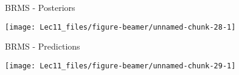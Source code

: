 \documentclass[11pt,ignorenonframetext,]{beamer}
\begin{document}
\begin{frame}{BRMS - Posteriors}
\protect\hypertarget{brms---posteriors}{}

\begin{center}\texttt{[image: Lec11\_files/figure-beamer/unnamed-chunk-28-1]} \end{center}

\end{frame}

\begin{frame}{BRMS - Predictions}
\protect\hypertarget{brms---predictions}{}

\begin{center}\texttt{[image: Lec11\_files/figure-beamer/unnamed-chunk-29-1]} \end{center}

\end{frame}
\end{document}
